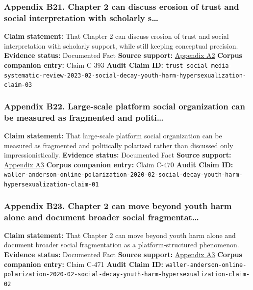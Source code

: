 \documentclass[
  american,
  11pt,
  letterpaper,
]{article}
\begin{document}
\subsubsection{Appendix B21. Chapter 2 can discuss erosion of trust and
social interpretation with scholarly
s\ldots{}}\label{ch-02-appendix-b21-chapter-2-can-discuss-erosion-of-trust-and-social-interpretation-with-scholarly-s}

\textbf{Claim statement:} That Chapter 2 can discuss erosion of trust
and social interpretation with scholarly support, while still keeping
conceptual precision. \textbf{Evidence status:} Documented Fact
\textbf{Source support:}
\hyperref[ch-02-appendix-a2-what-do-we-mean-when-we-talk-about-trust-in-social-media-a-systematic-review]{Appendix
A2} \textbf{Corpus companion entry:} Claim C-393 \textbf{Audit Claim
ID:}
\texttt{trust-social-media-systematic-review-2023-02-social-decay-youth-harm-hypersexualization-claim-03}

\subsubsection{Appendix B22. Large-scale platform social organization
can be measured as fragmented and
politi\ldots{}}\label{ch-02-appendix-b22-large-scale-platform-social-organization-can-be-measured-as-fragmented-and-politi}

\textbf{Claim statement:} That large-scale platform social organization
can be measured as fragmented and politically polarized rather than
discussed only impressionistically. \textbf{Evidence status:} Documented
Fact \textbf{Source support:}
\hyperref[ch-02-appendix-a3-quantifying-social-organization-and-political-polarization-in-online-platforms]{Appendix
A3} \textbf{Corpus companion entry:} Claim C-470 \textbf{Audit Claim
ID:}
\texttt{waller-anderson-online-polarization-2020-02-social-decay-youth-harm-hypersexualization-claim-01}

\subsubsection{Appendix B23. Chapter 2 can move beyond youth harm alone
and document broader social
fragmentat\ldots{}}\label{ch-02-appendix-b23-chapter-2-can-move-beyond-youth-harm-alone-and-document-broader-social-fragmentat}

\textbf{Claim statement:} That Chapter 2 can move beyond youth harm
alone and document broader social fragmentation as a platform-structured
phenomenon. \textbf{Evidence status:} Documented Fact \textbf{Source
support:}
\hyperref[ch-02-appendix-a3-quantifying-social-organization-and-political-polarization-in-online-platforms]{Appendix
A3} \textbf{Corpus companion entry:} Claim C-471 \textbf{Audit Claim
ID:}
\texttt{waller-anderson-online-polarization-2020-02-social-decay-youth-harm-hypersexualization-claim-02}
\end{document}
